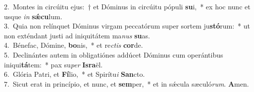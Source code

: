 {2.~}Montes in circúitu ejus:~† et Dóminus in circúitu pópuli \textbf{su}i,~* ex hoc nunc et usque \textit{in} \textbf{sǽ}\textbf{cu}lum.\\
{3.~}Quia non relínquet Dóminus virgam peccatórum super sortem ju\textbf{stó}rum:~* ut non exténdant justi ad iniquitátem ma\textit{nus} \textbf{su}as.\\
{4.~}Bénefac, Dómine, \textbf{bo}nis,~* et re\textit{ctis} \textbf{cor}de.\\
{5.~}Declinántes autem in obligatiónes addúcet Dóminus cum operántibus iniqui\textbf{tá}tem:~* pax su\textit{per} \textbf{Is}\textbf{ra}ël.\\
{6.~}Glória Patri, et \textbf{Fí}lio,~* et Spirítu\textit{i} \textbf{San}cto.\\
{7.~}Sicut erat in princípio, et nunc, et \textbf{sem}per,~* et in sǽcula sæculó\textit{rum}. \textbf{A}men.\\

